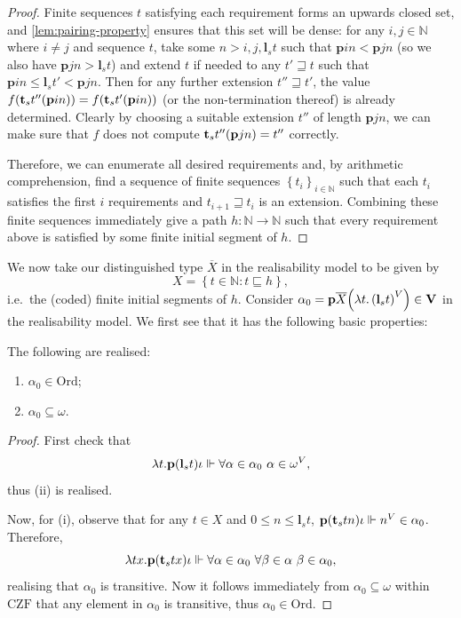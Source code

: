 \documentclass[preprint]{elsarticle}
\theoremstyle{plain}
\newcommand{\Ord}{\mathrm{Ord}}
\begin{document}
\begin{proof}
  Finite sequences $t$ satisfying each requirement forms an upwards closed set, and \autoref{lem:pairing-property} ensures that this set will be dense: for any $i, j \in \mathbb{N}$ where $i \neq j$  and sequence $t$, take some $n > i, j, \mathbf{l}_s t$ such that $\mathbf{p}in < \mathbf{p}jn$ (so we also have $\mathbf{p}jn > \mathbf{l}_s t$) and extend $t$ if needed to any $t' \sqsupseteq t$ such that $\mathbf{p}in \leq \mathbf{l}_s t' < \mathbf{p}jn$. Then for any further extension $t'' \sqsupseteq t'$, the value $f\mleft(\mathbf{t}_s t'' \mleft(\mathbf{p}in\mright)\mright) = f\mleft(\mathbf{t}_s t' \mleft(\mathbf{p}in\mright)\mright)$ (or the non-termination thereof) is already determined. Clearly by choosing a suitable extension $t''$ of length $\mathbf{p}jn$, we can make sure that $f$ does not compute $\mathbf{t}_s t'' \mleft(\mathbf{p}jn\mright) = t''$ correctly.

  Therefore, we can enumerate all desired requirements and, by arithmetic comprehension, find a sequence of finite sequences $\left\{t_i\right\}_{i \in \mathbb{N}}$ such that each $t_i$ satisfies the first $i$ requirements and $t_{i + 1} \sqsupseteq t_i$ is an extension. Combining these finite sequences immediately give a path $h : \mathbb{N} \rightarrow \mathbb{N}$ such that every requirement above is satisfied by some finite initial segment of $h$.
\end{proof}

We now take our distinguished type $\overline{X}$ in the realisability model to be given by
\[X = \left\{t \in \mathbb{N} : t \sqsubseteq h\right\},\]
i.e.\ the (coded) finite initial segments of $h$. Consider $\alpha_0 = \mathbf{p}\overline{X}\mleft(\lambda t. \left(\mathbf{l}_s t\right)^V\mright) \in \mathbf{V}$ in the realisability model. We first see that it has the following basic properties:

\begin{lemma}
  The following are realised:
  \begin{enumerate}[label=(\roman*)]
    \item $\alpha_0 \in \Ord$;
    \item $\alpha_0 \subseteq \omega$.
  \end{enumerate}
\end{lemma}

\begin{proof}
  First check that
  \[\lambda t. \mathbf{p}\mleft(\mathbf{l}_s t\mright)\iota \Vdash \forall \alpha \in \alpha_0 \ \alpha \in \omega^V,\]
  thus (ii) is realised.

  Now, for (i), observe that for any $t \in X$ and $0 \leq n \leq \mathbf{l}_s t$, $\mathbf{p}\mleft(\mathbf{t}_s tn\mright) \iota \Vdash n^V \in \alpha_0$. Therefore,
  \[\lambda tx. \mathbf{p}\mleft(\mathbf{t}_s tx\mright)\iota \Vdash \forall \alpha \in \alpha_0 \ \forall \beta \in \alpha \ \beta \in \alpha_0,\]
  realising that $\alpha_0$ is transitive. Now it follows immediately from $\alpha_0 \subseteq \omega$ within $\mathrm{CZF}$ that any element in $\alpha_0$ is transitive, thus $\alpha_0 \in \Ord$.
\end{proof}
\end{document}
